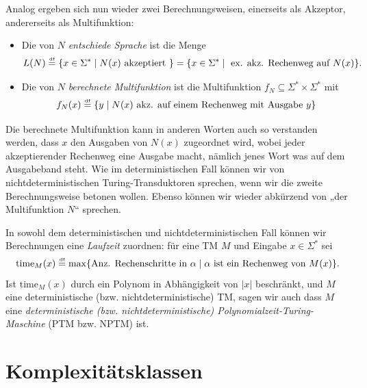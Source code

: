 Analog ergeben sich nun wieder zwei Berechnungsweisen, einerseits als Akzeptor, andererseits als Multifunktion:
\begin{itemize}
    \item Die von $N$ \emph{entschiede  Sprache} ist die Menge \[ L(N)\stackrel{\text{\smash{\tiny df}}}{=}\{ x\in\Sigma^* \mid N(x) \text{ akzeptiert } \} = \{ x\in\Sigma^* \mid \text{ ex. akz. Rechenweg auf $N(x)$} \}. \]
    \item Die von $N$ \emph{berechnete Multifunktion} ist die Multifunktion $f_N\subseteq\Sigma^*\times\Sigma^*$ mit
        \[ f_N(x) \stackrel{\text{\smash{\tiny df}}}{=} \{ y \mid \text{$N(x)$ akz. auf einem Rechenweg mit Ausgabe $y$} \}  \] 
\end{itemize}
Die berechnete Multifunktion kann in anderen Worten auch so verstanden werden, dass $x$ den Ausgaben von $N(x)$ zugeordnet wird, wobei jeder akzeptierender Rechenweg eine Ausgabe macht, nämlich jenes Wort was auf dem Ausgabeband steht.
Wie im deterministischen Fall können wir von nichtdeterministischen Turing-Transduktoren sprechen, wenn wir die zweite Berechnungsweise betonen wollen. Ebenso können wir wieder abkürzend von „der Multifunktion $N$“ sprechen.

In sowohl dem deterministischen und nichtdeterministischen Fall können wir Berechnungen eine \emph{Laufzeit} zuordnen: für eine TM $M$ und Eingabe $x\in\Sigma^*$ sei
\[ \mathrm{time}_M(x) \stackrel{\text{\smash{\tiny df}}}{=} \max \{ \text{Anz. Rechenschritte in $\alpha$} \mid \text{$\alpha$ ist ein Rechenweg von $M(x)$}  \}. \]
Ist $\mathrm{time}_M(x)$ durch ein Polynom in Abhängigkeit von $|x|$ beschränkt, und $M$ eine deterministische (bzw. nichtdeterministische) TM, sagen wir auch dass $M$ eine \emph{deterministische (bzw. nichtdeterministische) Polynomialzeit-Turing-Maschine} (PTM bzw. NPTM) ist. 


\section{Komplexitätsklassen}\label{sec:prelim-klassen}

